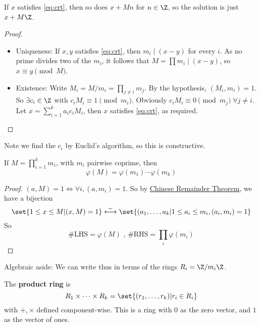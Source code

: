 \documentclass{article}
\begin{document}
\begin{remark}
    If $x$ satisfies \cref{eq:crt}, then so does $x+Mn$ for $n \in \Z$, so the solution is just $x + M\Z$.
\end{remark}

\begin{proof}
    \leavevmode
    \begin{itemize}
        \item Uniqueness: If $x, y$ satisfies  \cref{eq:crt}, then $m_i \mid (x-y)$ for every $i$. As no prime divides two of the $m_i$, it follows that $M= \prod m_i \mid (x-y)$, so $x \equiv y \pmod{M}$.
        \item Existence: Write $M_i = M/m_i = \prod_{j\neq i} m_j$.
            By the hypothesis, $(M_i, m_i) = 1$. So $ \exists c_i \in \Z$ with $c_i M _i \equiv 1 \pmod{m_i}$.
            Obviously $c_i M_i \equiv 0 \pmod{m_j}\; \forall j \neq i$. Let $x = \sum_{i=1}^k a_i c_i M_i$, then $x$ satisfies \cref{eq:crt}, as required.
    \end{itemize}
\end{proof}

Note we find the $c_i$ by Euclid's algorithm, so this is constructive.

\begin{cor}
    If $M = \prod_{i=1}^k m_i$, with $m_i$ pairwise coprime, then
    \begin{equation*}
        \varphi(M) = \varphi(m_1) \dotsm \varphi (m_k)
    \end{equation*}
\end{cor}

\begin{proof}
    $(a, M) = 1 \Leftrightarrow \forall i, (a, m_i)=1$. So by \hyperlink{thm:crt}{Chinese Remainder Theorem}, we have a bijection
    \begin{equation*}
        \set{ 1 \leq x \leq M | (x, M) = 1} \stackrel{\sim}{\longleftrightarrow} \set{ (a_1, \dotsc, a_k | 1 \leq a_i \leq m_i, (a_i, m_i) = 1 }
    \end{equation*} So
    \[ \#\text{LHS} = \varphi (M) \text{ , } \#\text{RHS} = \prod_i \varphi (m_i) \]
\end{proof}

Algebraic aside: We can write thus in terms of the rings $R_i = \Z / m_i \Z$.

\begin{defi}
    The \textbf{product ring} is
    \begin{equation*}
        R_1 \times \dotsb \times R_k = \set{(r_1, \dotsc, r_k) | r_i \in R_i }
    \end{equation*} with $+, \times$ defined component-wise.
    This is a ring with $0$ as the zero vector, and $1$ as the vector of ones.
\end{defi}
\end{document}
